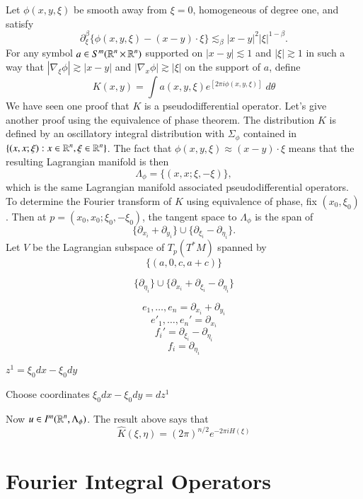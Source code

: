 \begin{example}
    Let $\phi(x,y,\xi)$ be smooth away from $\xi = 0$, homogeneous of degree one, and satisfy
    \[ \partial^\beta_\xi \{ \phi (x,y,\xi) - (x - y) \cdot \xi \} \lesssim_\beta |x - y|^2 |\xi|^{1-\beta}. \]
    For any symbol $a \in S^m(\operatorname{\mathbb{R}}^n \times \operatorname{\mathbb{R}}^n)$ supported on $|x - y| \lesssim 1$ and $|\xi| \gtrsim 1$ in such a way that $|\nabla_\xi \phi| \gtrsim |x - y|$ and $|\nabla_x \phi | \gtrsim |\xi|$ on the support of $a$, define
    \[ K(x,y) = \int a(x,y,\xi) e^[2 \pi i \phi(x,y,\xi)]\; d\theta \]
    We have seen one proof that $K$ is a pseudodifferential operator. Let's give another proof using the equivalence of phase theorem. The distribution $K$ is defined by an oscillatory integral distribution with $\Sigma_\phi$ contained in $\{ (x,x;\xi) : x \in \operatorname{\mathbb{R}}^n, \xi \in \operatorname{\mathbb{R}}^n \}$. The fact that $\phi(x,y,\xi) \approx (x - y) \cdot \xi$ means that the resulting Lagrangian manifold is then
    \[ \Lambda_\phi = \{ (x,x; \xi, - \xi ) \}, \]
    which is the same Lagrangian manifold associated pseudodifferential operators. To determine the Fourier transform of $K$ using equivalence of phase, fix $(x_0,\xi_0)$. Then at $p = (x_0,x_0;\xi_0,-\xi_0)$, the tangent space to $\Lambda_\phi$ is the span of
    \[ \{ \partial_{x_i} + \partial_{y_i} \} \cup \{ \partial_{\xi_i} - \partial_{\eta_i} \}. \]
    Let $V$ be the Lagrangian subspace of $T_p(T^* M)$ spanned by
    \[ \{ (a,0,c,a + c) \} \]

    \[ \{ \partial_{\eta_i} \} \cup \{ \partial_{x_i} + \partial_{\xi_i} - \partial_{\eta_i} \} \]

    \[ e_1,\dots,e_n = \partial_{x_i} + \partial_{y_i} \]
    \[ e'_1,\dots,e_n' = \partial_{x_i} \]
    \[ f_i' = \partial_{\xi_i} - \partial_{\eta_i} \]
    \[ f_i = \partial_{\eta_i} \]


    $z^1 = \xi_0 dx - \xi_0 dy$

    Choose coordinates $\xi_0 dx - \xi_0 dy = dz^1$


    Now $u \in I^m(\operatorname{\mathbb{R}}^n, \Lambda_\phi)$. The result above says that
    \[ \widehat{K}(\xi,\eta) = (2 \pi)^{n/2} e^{-2 \pi i H(\xi)} \]
\end{example}


\section{Fourier Integral Operators}

